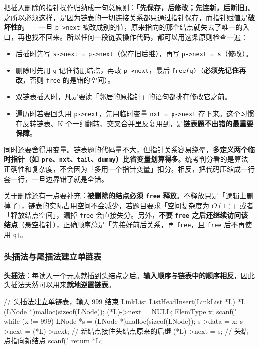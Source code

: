 \documentclass[11pt,openany,UTF8]{ctexbook}
\begin{document}
把插入删除的指针操作归纳成一句总原则：\textbf{「先保存，后修改；先连新，后断旧」}。之所以必须这样，是因为链表的一切连接关系都只通过指针保存，而指针赋值是\textbf{破坏性}的——一旦 \texttt{p->\allowbreak{}next} 被改成别的值，原来指向的那个结点就失去了唯一的入口，再也找不回来。所以任何一段链表操作代码，都可以用这条原则检查一遍：

\begin{itemize}
\item 后插时先写 \texttt{s->\allowbreak{}next =\allowbreak{} p->\allowbreak{}next}（保存旧后继），再写 \texttt{p->\allowbreak{}next =\allowbreak{} s}（修改）。
\item 删除时先用 \texttt{q} 记住待删结点，再改 \texttt{p->\allowbreak{}next}，最后 \texttt{free(q)\allowbreak{}}（\textbf{必须先记住再改}，否则 \texttt{free} 的是错的空间）。
\item 双链表插入时，凡是要读「邻居的原指针」的语句都排在修改它之前。
\item 遍历时若要回头用 \texttt{p->\allowbreak{}next}，先用临时变量 \texttt{nxt =\allowbreak{} p->\allowbreak{}next} 存下来。这个习惯在反转链表、K 个一组翻转、交叉合并里反复用到，是\textbf{链表题不出错的最重要保障}。
\end{itemize}
同时还要舍得用变量。链表题的代码量不大，但指针关系容易绕晕，\textbf{多定义两个临时指针（如 \texttt{pre}、\texttt{nxt}、\texttt{tail}、\texttt{dummy}）比省变量划算得多}。统考判分看的是算法正确性和复杂度，不会因为「多用一个指针变量」扣分。相反，把代码压缩成一行套一行，一旦边界错了就是全错。

关于删除还有一点要补充：\textbf{被删除的结点必须 \texttt{free} 释放}。不释放只是「逻辑上删掉了」，链表的实际占用空间不会减少，若题目要求「空间复杂度为 $O(1)$」或者「释放结点空间」，漏掉 \texttt{free} 会直接失分。另外，\textbf{不要 \texttt{free} 之后还继续访问该结点}（悬空指针），正确顺序总是「先接好前后关系，再 \texttt{free}，且 \texttt{free} 后不再使用 \texttt{q}」。

\subsubsection{头插法与尾插法建立单链表}

\textbf{头插法}：每读入一个元素就插到头结点之后。\textbf{输入顺序与链表中的顺序相反}，因此头插法天然可以用来\textbf{就地逆置链表}。

\begin{codebox}
// 头插法建立单链表，输入 999 结束
LinkList ListHeadInsert(LinkList *L) {
    *L = (LNode *)malloc(sizeof(LNode));
    (*L)->next = NULL;
    ElemType x;
    scanf("%
    while (x != 999) {
        LNode *s = (LNode *)malloc(sizeof(LNode));
        s->data = x;
        s->next = (*L)->next;   // 新结点接住头结点原来的后继
        (*L)->next = s;         // 头结点指向新结点
        scanf("%
    }
    return *L;
}
\end{codebox}
\end{document}
